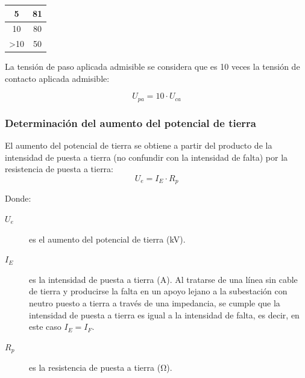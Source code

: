 \begin{table}[H]
\begin{tabular}{|c|c|}
5                                                                                           & 81                                                                                                 \\ \hline
10                                                                                          & 80                                                                                                 \\ \hline
\textgreater 10                                                                             & 50                                                                                                 \\ \hline
\end{tabular}
\end{table}

La tensión de paso aplicada admisible se considera que es 10 veces la tensión de contacto aplicada admisible:

\begin{equation}
    U_{pa} = 10\cdot U_{ca}
    \label{eq:pat-Upa}
\end{equation}

\subsubsection{Determinación del aumento del potencial de tierra}
\label{subsubsec:apoyosF-potencialTierra-pat}
El aumento del potencial de tierra se obtiene a partir del producto de la intensidad de puesta a tierra (no confundir con la intensidad de falta) por la resistencia de puesta a tierra:
\begin{equation}
    U_e = I_E\cdot R_p
    \label{eq:pat-Ue}
\end{equation}

Donde:
\begin{description}
    \item[$U_e$] es el aumento del potencial de tierra (\si{\kilo\volt}).
    \item[$I_E$] es la intensidad de puesta a tierra (\si{\ampere}). Al tratarse de una línea sin cable de tierra y producirse la falta en un apoyo lejano a la subestación con neutro puesto a tierra a través de una impedancia, se cumple que la intensidad de puesta a tierra es igual a la intensidad de falta, es decir, en este caso $I_E=I_F$.
    \item[$R_p$] es la resistencia de puesta a tierra (\si{\ohm}).
\end{description}

